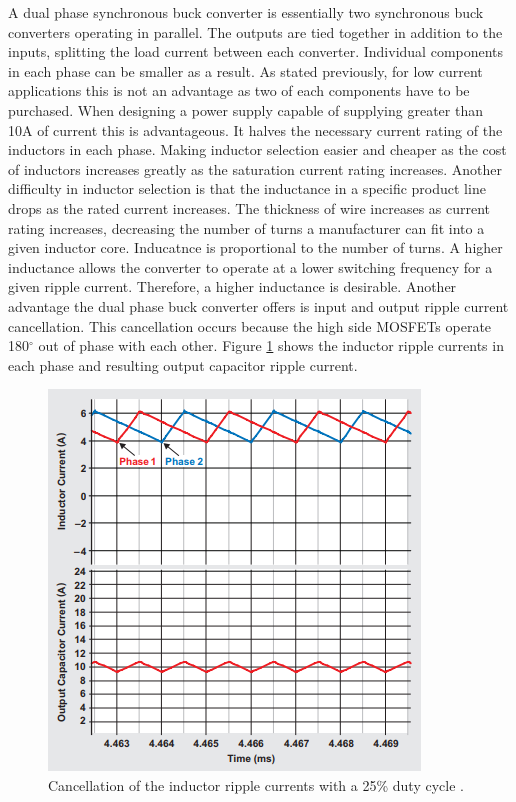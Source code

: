 \documentclass[11pt]{article}
\begin{document}
    \noindent A dual phase synchronous buck converter is essentially two synchronous buck converters operating in parallel. The outputs are tied together in addition to the inputs, splitting the load current between each converter. Individual components in each phase can be smaller as a result. As stated previously, for low current applications this is not an advantage as two of each components have to be purchased. When designing a power supply capable of supplying greater than 10A of current this is advantageous. It halves the necessary current rating of the inductors in each phase. Making inductor selection easier and cheaper as the cost of inductors increases greatly as the saturation current rating increases. Another difficulty in inductor selection is that the inductance in a specific product line drops as the rated current increases. The thickness of wire increases as current rating increases, decreasing the number of turns a manufacturer can fit into a given inductor core. Inducatnce is proportional to the number of turns. A higher inductance allows the converter to operate at a lower switching frequency for a given ripple current. Therefore, a higher inductance is desirable.
    \newline
    \newline
    \noindent Another advantage the dual phase buck converter offers is input and output ripple current cancellation. This cancellation occurs because the high side MOSFETs operate 180$^{\circ}$ out of phase with each other. Figure \ref{outripple} shows the inductor ripple currents in each phase and resulting output capacitor ripple current.
    
    \begin{figure}[H]
            \centering
            \includegraphics[width=0.4\linewidth]{outputripplecap.PNG}
            \caption{Cancellation of the inductor ripple currents with a 25\% duty cycle \cite{david_baba_benefits_2012}.}
            \label{outripple}
        \end{figure}
        
\end{document}
